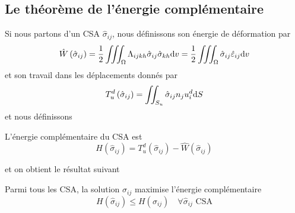 \subsection{Le théorème de l'énergie complémentaire} \label{ssec:Ch09-1.3}
Si nous partons d'un CSA $\hat{\sigma}_{ij}$, nous définissons son énergie de déformation par
\begin{equation}
    \hat{W}\left( \hat{\sigma}_{ij} \right) = \frac{1}{2} \iiint_{\Omega} \Lambda_{ijkh} \hat{\sigma}_{ij} \hat{\sigma}_{kh} \mathrm{d} v = \frac{1}{2} \iiint_{\Omega} \hat{\sigma}_{ij} \hat{\varepsilon}_{ij} \mathrm{d} v
    \label{eq:Ch09-022}
\end{equation}
et son travail dans les déplacements donnés par 
\begin{equation}
    T_{u}^d \left( \hat{\sigma}_{ij} \right) = \iint_{S_u} \hat{\sigma}_{ij} n_j u_i^d \mathrm{d} S
    \label{eq:Ch09-023}
\end{equation}
et nous définissons 
\begin{deff}
    L'énergie complémentaire du CSA est
    \begin{equation}
        H \left( \hat{\sigma}_{ij} \right) = T_{u}^d \left( \hat{\sigma}_{ij} \right) - \hat{W}\left( \hat{\sigma}_{ij} \right)
        \label{eq:Ch09-024}
    \end{equation}
\end{deff}
et on obtient le résultat suivant 
\begin{thm}
    Parmi tous les CSA, la solution $\sigma_{ij}$ maximise l'énergie complémentaire
    \begin{equation}
        H \left( \hat{\sigma}_{ij} \right) \leq H \left( \sigma_{ij} \right) \quad \forall \hat{\sigma}_{ij} \text{ CSA}
        \label{eq:Ch09-025}
    \end{equation}
\end{thm}
